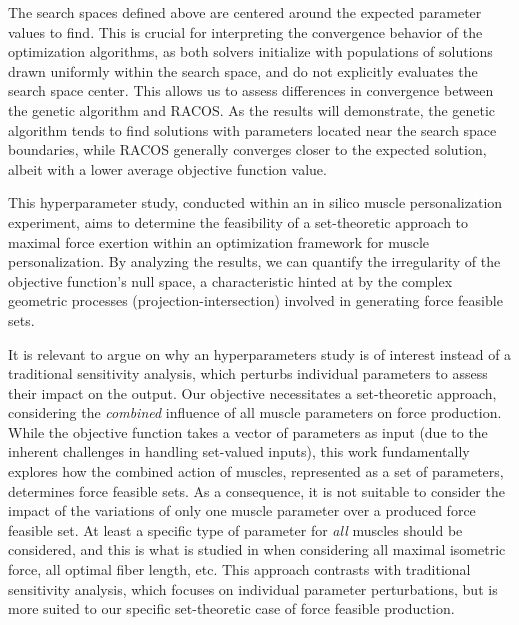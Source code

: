The search spaces defined above are centered around the expected parameter values to find. This is crucial for interpreting the convergence behavior of the optimization algorithms, as both solvers initialize with populations of solutions drawn uniformly within the search space, and do not explicitly evaluates the search space center. This allows us to assess differences in convergence between the genetic algorithm and RACOS. As the results will demonstrate, the genetic algorithm tends to find solutions with parameters located near the search space boundaries, while RACOS generally converges closer to the expected solution, albeit with a lower average objective function value.



This hyperparameter study, conducted within an in silico muscle personalization experiment, aims to determine the feasibility of a set-theoretic approach to maximal force exertion within an optimization framework for muscle personalization. By analyzing the results, we can quantify the irregularity of the objective function's null space, a characteristic hinted at by the complex geometric processes (projection-intersection) involved in generating force feasible sets.

It is relevant to argue on why an hyperparameters study is of interest instead of a traditional sensitivity analysis, which perturbs individual parameters to assess their impact on the output. Our objective necessitates a set-theoretic approach, considering the \emph{combined} influence of all muscle parameters on force production. While the objective function takes a vector of parameters as input (due to the inherent challenges in handling set-valued inputs), this work fundamentally explores how the combined action of muscles, represented as a set of parameters, determines force feasible sets. As a consequence, it is not suitable to consider the impact of the variations of only one muscle parameter over a produced force feasible set. At least a specific type of parameter for \emph{all} muscles should be considered, and this is what is studied in when considering all maximal isometric force, all optimal fiber length, etc. This approach contrasts with traditional sensitivity analysis, which focuses on individual parameter perturbations, but is more suited to our specific set-theoretic case of force feasible production.

